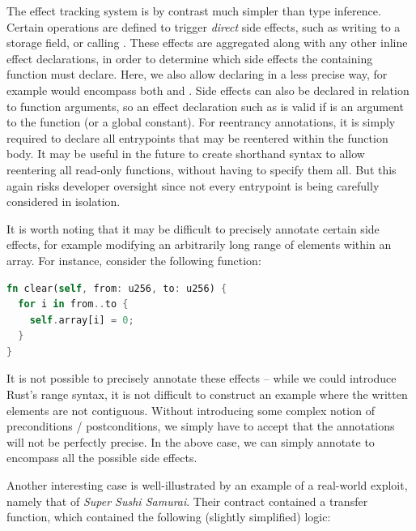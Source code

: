 The effect tracking system is by contrast much simpler than type inference. Certain operations are defined to trigger \textit{direct} side effects, such as writing to a storage field, or calling . These effects are aggregated along with any other inline effect declarations, in order to determine which side effects the containing function must declare. Here, we also allow declaring in a less precise way, for example  would encompass both  and . Side effects can also be declared in relation to function arguments, so an effect declaration such as  is valid if  is an argument to the function (or a global constant). For reentrancy annotations, it is simply required to declare all entrypoints that may be reentered within the function body. It may be useful in the future to create shorthand syntax to allow reentering all read-only functions, without having to specify them all. But this again risks developer oversight since not every entrypoint is being carefully considered in isolation.
\par
It is worth noting that it may be difficult to precisely annotate certain side effects, for example modifying an arbitrarily long range of elements within an array. For instance, consider the following function:
\begin{lstlisting}[language=Rust, style=boxed]
fn clear(self, from: u256, to: u256) {
  for i in from..to {
    self.array[i] = 0;
  }
}
\end{lstlisting}
It is not possible to precisely annotate these effects -- while we could introduce Rust's range syntax, it is not difficult to construct an example where the written elements are not contiguous. Without introducing some complex notion of preconditions / postconditions, we simply have to accept that the annotations will not be perfectly precise. In the above case, we can simply annotate  to encompass all the possible side effects. \par
Another interesting case is well-illustrated by an example of a real-world exploit, namely that of \textit{Super Sushi Samurai}. Their contract contained a transfer function, which contained the following (slightly simplified) logic:
